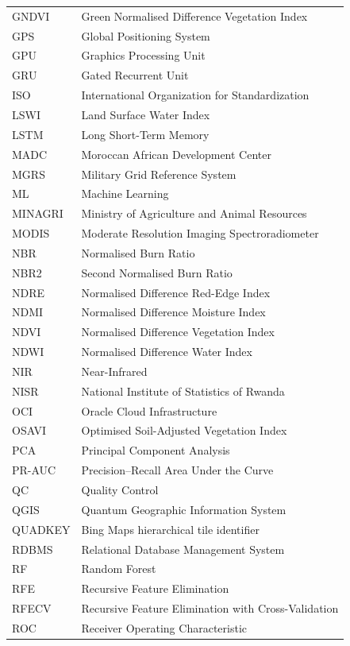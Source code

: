 \begin{longtable}{@{}p{3cm}p{10cm}@{}}
GNDVI & Green Normalised Difference Vegetation Index \\
GPS & Global Positioning System \\
GPU & Graphics Processing Unit \\
GRU & Gated Recurrent Unit \\
ISO & International Organization for Standardization \\
LSWI & Land Surface Water Index \\
LSTM & Long Short-Term Memory \\
MADC & Moroccan African Development Center \\
MGRS & Military Grid Reference System \\
ML & Machine Learning \\
MINAGRI & Ministry of Agriculture and Animal Resources \\
MODIS & Moderate Resolution Imaging Spectroradiometer \\
NBR & Normalised Burn Ratio \\
NBR2 & Second Normalised Burn Ratio \\
NDRE & Normalised Difference Red-Edge Index \\
NDMI & Normalised Difference Moisture Index \\
NDVI & Normalised Difference Vegetation Index \\
NDWI & Normalised Difference Water Index \\
NIR & Near-Infrared \\
NISR & National Institute of Statistics of Rwanda \\
OCI & Oracle Cloud Infrastructure \\
OSAVI & Optimised Soil-Adjusted Vegetation Index \\
PCA & Principal Component Analysis \\
PR-AUC & Precision--Recall Area Under the Curve \\
QC & Quality Control \\
QGIS & Quantum Geographic Information System \\
QUADKEY & Bing Maps hierarchical tile identifier \\
RDBMS & Relational Database Management System \\
RF & Random Forest \\
RFE & Recursive Feature Elimination \\
RFECV & Recursive Feature Elimination with Cross-Validation \\
ROC & Receiver Operating Characteristic \\

\end{longtable}
